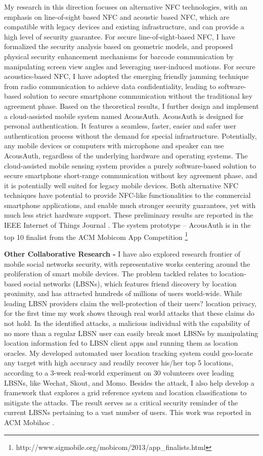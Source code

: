 \documentclass[11pt]{article}
\begin{document}
My research in this direction focuses on alternative NFC technologies, with an emphasis on line-of-sight based NFC and acoustic based NFC, which are compatible with legacy devices and existing infrastructure, and can provide a high level of security guarantee. For secure line-of-sight-based NFC, I have formalized the security analysis based on geometric models, and proposed physical security enhancement mechanisms for barcode communication by manipulating screen view angles and leveraging user-induced motions. For secure acoustics-based NFC, I have adopted the emerging friendly jamming technique from radio communication to achieve data confidentiality, leading to software-based solution to secure smartphone communication without the traditional key agreement phase. Based on the theoretical results, I further design and implement a cloud-assisted mobile system named AcousAuth. AcousAuth is designed for personal authentication. It features a seamless, faster, easier and safer user authentication process without the demand for special infrastructure. Potentially, any mobile devices or computers with microphone and speaker can use AcousAuth, regardless of the underlying hardware and operating systems. The cloud-assisted mobile sensing system provides a purely software-based solution to secure smartphone short-range communication without key agreement phase, and it is potentially well suited for legacy mobile devices. Both alternative NFC techniques have potential to provide NFC-like functionalities to the commercial smartphone applications, and enable much stronger security guarantees, yet with much less strict hardware support. These preliminary results are reported in the IEEE Internet of Things Journal \cite{IEEE}. The system prototype -- AcousAuth is in the top 10 finalist from the ACM Mobicom App Competition \footnote{http://www.sigmobile.org/mobicom/2013/app\_finalists.html}


\textbf{Other Collaborative Research -} I have also explored research frontier of mobile social networks security, with representative works centering around the proliferation of smart mobile devices. The problem tackled relates to location-based social networks (LBSNs), which features friend discovery by location proximity, and has attracted hundreds of millions of users world-wide. While leading LBSN providers claim the well-protection of their users? location privacy, for the first time my work shows through real world attacks that these claims do not hold. In the identified attacks, a malicious individual with the capability of no more than a regular LBSN user can easily break most LBSNs by manipulating location information fed to LBSN client apps and running them as location oracles. My developed automated user location tracking system could geo-locate any target with high accuracy and readily recover his/her top 5 locations, according to a 3-week real-world experiment on 30 volunteers over leading LBSNs, like Wechat, Skout, and Momo. Besides the attack, I also help develop a framework that explores a grid reference system and location classifications to mitigate the attacks. The result serves as a critical security reminder of the current LBSNs pertaining to a vast number of users. This work was reported in ACM Mobihoc \cite{mobihoc}. 
\end{document}
